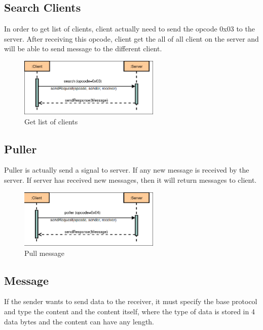 \subsection{Search Clients}\label{subsec:search}
In order to get list of clients, client actually need to send the opcode 0x03 to the server.
After receiving this opcode, client get the all of all client on the server and will be able to
send message to the different client.

\begin{figure}[htb!]
    \centering
    \includegraphics[width=0.6\textwidth]{gfx/protocoll_search}
    \caption{Get list of clients}
    \label{fig:client-list}
\end{figure}

\subsection{Puller}\label{subsec:poller}
Puller is actually send a signal to server.
If any new message is received by the server.
If server has received new messages, then it will return messages to client.

\begin{figure}[htb!]
    \centering
    \includegraphics[width=0.6\textwidth]{gfx/protocoll_poller}
    \caption{Pull message}
    \label{fig:pull-message}
\end{figure}

\subsection{Message}\label{subsec:message}
If the sender wants to send data to the receiver, it must specify the base protocol and type
the content and the content itself, where the type of data is stored in 4 data bytes and the
content can have any length.
\medskip

